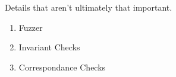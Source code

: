 Details that aren't ultimately that important.

\begin{enumerate}
\item Fuzzer
\item Invariant Checks
\item Correspondance Checks
\end{enumerate}



